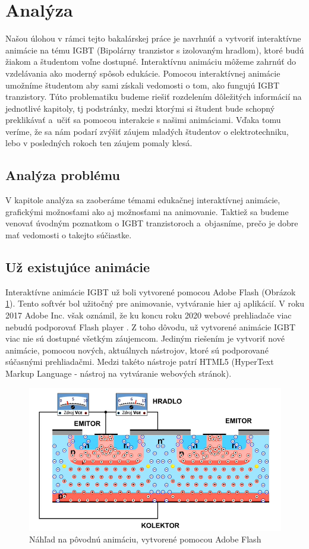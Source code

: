 \section{Analýza}
\noindent Našou úlohou v rámci tejto bakalárskej práce je navrhnúť a vytvoriť interaktívne animácie na tému \acrshort{IGBT} (Bipolárny tranzistor s izolovaným hradlom), ktoré budú  žiakom a študentom voľne dostupné. Interaktívnu animáciu môžeme zahrnúť do vzdelávania ako moderný spôsob edukácie. Pomocou interaktívnej animácie umožníme študentom aby sami získali vedomosti o tom, ako fungujú \acrshort{IGBT} tranzistory. Túto problematiku budeme riešiť rozdelením dôležitých informácií na jednotlivé kapitoly, tj podstránky, medzi ktorými si študent bude schopný preklikávať a učiť sa pomocou interakcie s našimi animáciami. Vďaka tomu veríme, že sa nám podarí zvýšiť záujem mladých študentov o elektrotechniku, lebo v posledných  rokoch ten záujem pomaly klesá.

\subsection{Analýza problému}
\noindent V kapitole analýza sa zaoberáme témami edukačnej interaktívnej animácie, grafickými možnosťami ako aj možnosťami na animovanie. Taktiež sa budeme venovať úvodným poznatkom o \acrshort{IGBT} tranzistoroch a objasníme,  prečo je dobre mať vedomosti o  takejto súčiastke.

\subsection{Už existujúce animácie}
\noindent Interaktívne animácie \acrshort{IGBT} už boli vytvorené pomocou Adobe Flash (Obrázok \ref{Oldbutgold}). Tento softvér  bol užitočný pre animovanie, vytváranie hier aj aplikácií. V roku 2017 Adobe Inc. však oznámil, že ku koncu roku 2020 webové prehliadače viac nebudú podporovať Flash player \cite{c1}. Z toho dôvodu, už vytvorené animácie \acrshort{IGBT} viac nie sú dostupné všetkým záujemcom. Jediným riešením je vytvoriť nové animácie, pomocou nových, aktuálnych nástrojov, ktoré sú podporované súčasnými prehliadačmi. Medzi takéto nástroje patrí HTML5 (HyperText Markup Language - nástroj na vytváranie webových stránok).

\begin{figure}[!htbp]
    \centering
    \includegraphics[width=12cm]{img/zzzzz.PNG}
    \caption{Náhľad na pôvodnú animáciu, vytvorené pomocou Adobe Flash}
    \label{Oldbutgold}
\end{figure}

